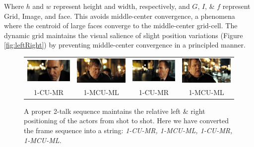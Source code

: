 Where $h$ and $w$ represent height and width, respectively, and $G$, $I$, \& $f$ represent Grid, Image, and face. This avoids middle-center convergence, a phenomena where the centroid of large faces converge to the middle-center grid-cell. The dynamic grid  maintains the visual salience of slight position variations (Figure \ref{fig:leftRight}) by preventing middle-center convergence in a principled manner. 
\begin{figure}
\begin{center}
\begin{tabular}{c c c c}
\includegraphics[width=0.22\linewidth]
  {fig/r1.jpg}
& \includegraphics[width=0.22\linewidth]
  {fig/l1.jpg}
& \includegraphics[width=0.22\linewidth]
  {fig/r2.jpg}
& \includegraphics[width=0.22\linewidth]
  {fig/l2.jpg}
\\
\large{1-CU-MR} & \large{1-MCU-ML} & \large{1-CU-MR} & \large{1-MCU-ML} \\
\end{tabular}
\end{center}
\caption{A proper 2-talk sequence maintains the relative left \& right positioning of the actors from shot to shot. Here we have converted the frame sequence into a string: \textit{1-CU-MR, 1-MCU-ML, 1-CU-MR, 1-MCU-ML.}}
\label{fig:2talk}
\end{figure}

